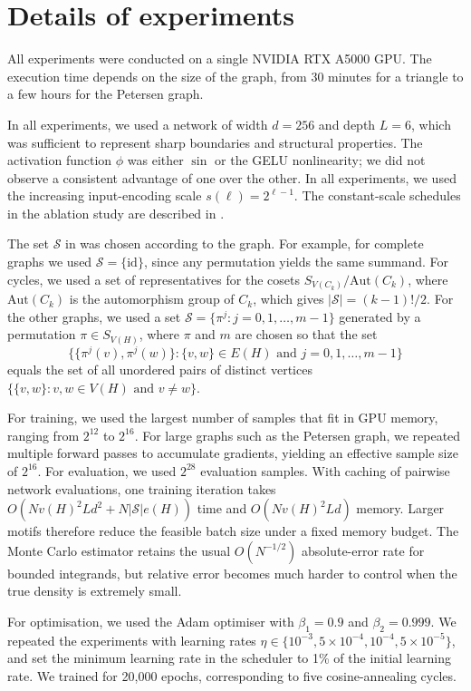 \documentclass[11pt]{article}
\theoremstyle{plain}
\theoremstyle{definition}
\theoremstyle{remark}
\begin{document}
\section{Details of experiments} \label{sec:experimentdetails}

All experiments were conducted on a single NVIDIA RTX A5000 GPU.
The execution time depends on the size of the graph, from 30 minutes for a triangle to a few hours for the Petersen graph.

In all experiments, we used a network of width $d=256$ and depth $L=6$, which was sufficient to represent sharp boundaries and structural properties.
The activation function $\phi$ was either $\sin$ or the GELU nonlinearity; we did not observe a consistent advantage of one over the other.
In all experiments, we used the increasing input-encoding scale $s(\ell)=2^{\ell-1}$. The constant-scale schedules in the ablation study are described in .

The set $\mathcal{S}$ in  was chosen according to the graph. For example, for complete graphs we used $\mathcal{S}=\{\mathrm{id}\}$, since any permutation yields the same summand.
For cycles, we used a set of representatives for the cosets $S_{V(C_k)} / \text{Aut}(C_k)$, where $\text{Aut}(C_k)$ is the automorphism group of $C_k$, which gives $|\mathcal{S}| = (k-1)! / 2$.
For the other graphs, we used a set $\mathcal{S}=\{\pi^j : j = 0, 1, \ldots, m-1\}$ generated by a permutation $\pi \in S_{V(H)}$, where $\pi$ and $m$ are chosen so that the set
\[
  \{\{\pi^j(v), \pi^j(w)\} : \{v, w\} \in E(H) \text{ and } j = 0, 1, \ldots, m-1\}
\]
equals the set of all unordered pairs of distinct vertices $\{\{v, w\} : v, w \in V(H) \text{ and } v \neq w\}$.

For training, we used the largest number of samples that fit in GPU memory, ranging from $2^{12}$ to $2^{16}$.
For large graphs such as the Petersen graph, we repeated multiple forward passes to accumulate gradients, yielding an effective sample size of $2^{16}$.
For evaluation, we used $2^{28}$ evaluation samples.
With caching of pairwise network evaluations, one training iteration takes $O(Nv(H)^2Ld^2 + N|\mathcal{S}|e(H))$ time and $O(Nv(H)^2Ld)$ memory. Larger motifs therefore reduce the feasible batch size under a fixed memory budget. The Monte Carlo estimator retains the usual $O(N^{-1/2})$ absolute-error rate for bounded integrands, but relative error becomes much harder to control when the true density is extremely small.

For optimisation, we used the Adam optimiser with $\beta_1=0.9$ and $\beta_2=0.999$.
We repeated the experiments with learning rates $\eta \in \{10^{-3}, 5 \times 10^{-4}, 10^{-4}, 5 \times 10^{-5}\}$, and set the minimum learning rate in the scheduler to 1\% of the initial learning rate.
We trained for 20,000 epochs, corresponding to five cosine-annealing cycles.
\end{document}
